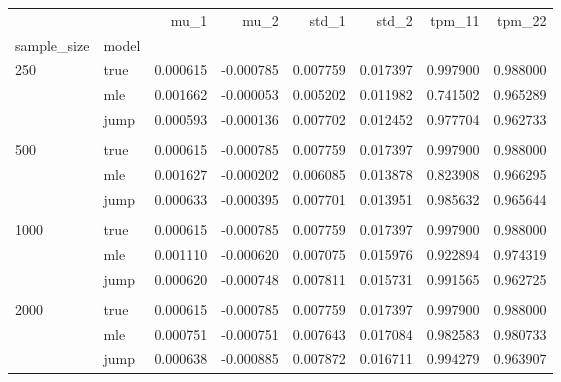 \begin{tabular}{llrrrrrr}
\toprule
     &      &      mu\_1 &      mu\_2 &     std\_1 &     std\_2 &    tpm\_11 &    tpm\_22 \\
sample\_size & model &           &           &           &           &           &           \\
\midrule
250  & true &  0.000615 & -0.000785 &  0.007759 &  0.017397 &  0.997900 &  0.988000 \\
     & mle &  0.001662 & -0.000053 &  0.005202 &  0.011982 &  0.741502 &  0.965289 \\
     & jump &  0.000593 & -0.000136 &  0.007702 &  0.012452 &  0.977704 &  0.962733 \\
     \\
500  & true &  0.000615 & -0.000785 &  0.007759 &  0.017397 &  0.997900 &  0.988000 \\
     & mle &  0.001627 & -0.000202 &  0.006085 &  0.013878 &  0.823908 &  0.966295 \\
     & jump &  0.000633 & -0.000395 &  0.007701 &  0.013951 &  0.985632 &  0.965644 \\
     \\
1000 & true &  0.000615 & -0.000785 &  0.007759 &  0.017397 &  0.997900 &  0.988000 \\
     & mle &  0.001110 & -0.000620 &  0.007075 &  0.015976 &  0.922894 &  0.974319 \\
     & jump &  0.000620 & -0.000748 &  0.007811 &  0.015731 &  0.991565 &  0.962725 \\
     \\
2000 & true &  0.000615 & -0.000785 &  0.007759 &  0.017397 &  0.997900 &  0.988000 \\
     & mle &  0.000751 & -0.000751 &  0.007643 &  0.017084 &  0.982583 &  0.980733 \\
     & jump &  0.000638 & -0.000885 &  0.007872 &  0.016711 &  0.994279 &  0.963907 \\
\bottomrule
\end{tabular}
